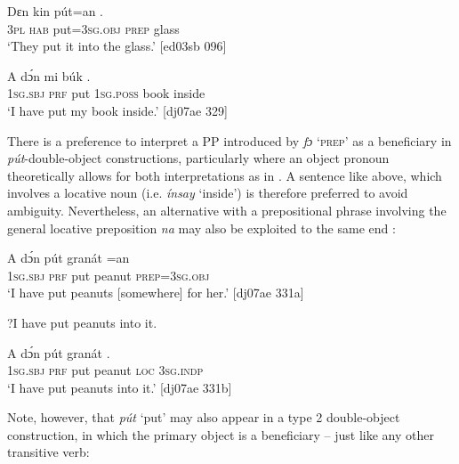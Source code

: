 \ea%
    \label{ex:key:1217}
    \gll Dɛn  kin  pút=an      .\\
\textsc{3pl}  \textsc{hab}  put=\textsc{3sg.obj}  \textsc{prep}  glass\\

\glt ‘They put it into the glass.’ [ed03sb 096]
\z


\ea%
    \label{ex:key:1218}
    \gll \MakeUppercase{A}   dɔ́n      mi    búk    .\\
\textsc{1sg.sbj}  \textsc{prf}    put  \textsc{1sg.poss}  book  inside\\

\glt ‘I have put my book inside.’ [dj07ae 329]
\z

There is a preference to interpret a PP introduced by \textit{fɔ} ‘\textsc{prep}’ as a beneficiary in \textit{pút}{}-double-object constructions, particularly where an object pronoun theoretically allows for both interpretations as in . A sentence like  above, which involves a locative noun (i.e. \textit{ínsay} ‘inside’) is therefore preferred to avoid ambiguity. Nevertheless, an alternative with a prepositional phrase involving the general locative preposition \textit{na} may also be exploited to the same end : 


\ea%
    \label{ex:key:1219}
    \gll A    dɔ́n  pút  granát  =an\\
\textsc{1sg.sbj}  \textsc{prf}  put  peanut  \textsc{prep}=\textsc{3sg.obj}\\

\glt ‘I have put peanuts [somewhere] for her.’ [dj07ae 331a]


\glt ?I have put peanuts into it. 
\z


\ea%
    \label{ex:key:1220}
    \gll A    dɔ́n  pút  granát    .\\
\textsc{1sg.sbj}  \textsc{prf}  put  peanut  \textsc{loc}  \textsc{3sg.indp}\\

\glt ‘I have put peanuts into it.’ [dj07ae 331b]
\z

Note, however, that \textit{pút} ‘put’ may also appear in a type 2 double-object construction, in which the primary object is a beneficiary – just like any other transitive verb:


